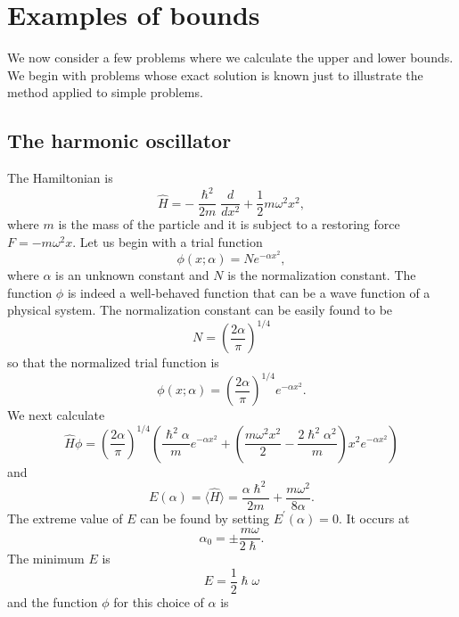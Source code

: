 \documentclass{article}
\numberwithin{equation}{section}
\begin{document}
\section{Examples of bounds}\label{s5}
We now consider a few problems where we calculate the upper and lower
bounds. We begin with problems whose exact solution is known just to
illustrate the method applied to simple problems.
\subsection{The harmonic oscillator}
The Hamiltonian is
\begin{equation}\label{s5e1}
\hat{H} = -\frac{\hslash^2}{2m}\frac{d}{dx^2} + \frac{1}{2}m\omega^2x^2,
\end{equation}
where $m$ is the mass of the particle and it is subject to a restoring
force $F = -m\omega^2 x$. Let us begin with a trial function
\begin{equation}\label{s5e2}
\phi(x;\alpha) = Ne^{-\alpha x^2},
\end{equation}
where $\alpha$ is an unknown constant and $N$ is the normalization constant.
The function $\phi$ is indeed a well-behaved function that can be a wave 
function of a physical system. The normalization constant can be easily
found to be
\[
N = \left(\frac{2\alpha}{\pi}\right)^{1/4}
\]
so that the normalized trial function is
\begin{equation}\label{s5e3}
\phi(x;\alpha) = \left(\frac{2\alpha}{\pi}\right)^{1/4}e^{-\alpha x^2}.
\end{equation}
We next calculate
\begin{equation}\label{s5e4}
\hat{H}\phi = \left(\frac{2\alpha}{\pi}\right)^{1/4}\left(\frac{\hslash^2
\alpha}{m}e^{-\alpha x^2} + \left(\frac{m\omega^2x^2}{2} - \frac{2\hslash^2
\alpha^2}{m}\right)x^2e^{-\alpha x^2}\right)
\end{equation}
and 
\begin{equation}\label{s5e5}
E(\alpha) = \langle\hat{H}\rangle = \frac{\alpha\hslash^2}{2m} + 
\frac{m\omega^2}{8\alpha}.
\end{equation}
The extreme value of $E$ can be found by setting $E^\prime(\alpha) = 0$. It
occurs at
\begin{equation}\label{s5e6}
\alpha_0 = \pm\frac{m\omega}{2\hslash}.
\end{equation}
The minimum $E$ is
\begin{equation}\label{s5e7}
E = \frac{1}{2}\hslash\omega
\end{equation}
and the function $\phi$ for this choice of $\alpha$ is
\end{document}
